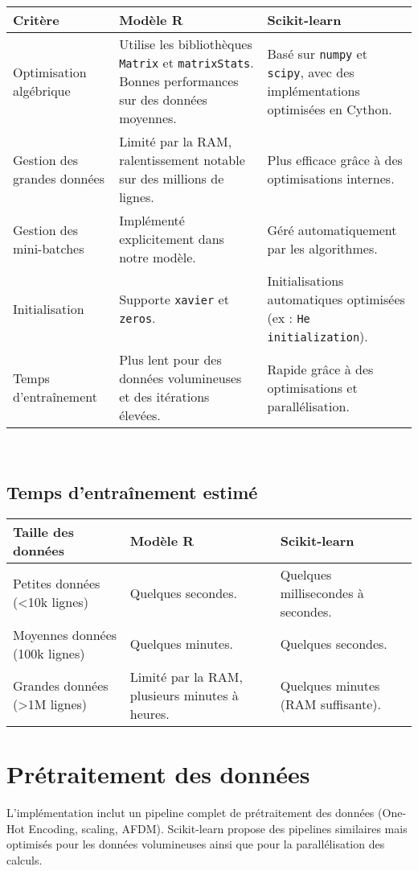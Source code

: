 \documentclass[a4paper,12pt]{article}
\begin{document}
\begin{longtable}{|p{5cm}|p{5cm}|p{5cm}|}
\hline
\textbf{Critère} & \textbf{Modèle R} & \textbf{Scikit-learn} \\
\hline
Optimisation algébrique & Utilise les bibliothèques \texttt{Matrix} et \texttt{matrixStats}. Bonnes performances sur des données moyennes. & Basé sur \texttt{numpy} et \texttt{scipy}, avec des implémentations optimisées en Cython. \\
\hline
Gestion des grandes données & Limité par la RAM, ralentissement notable sur des millions de lignes. & Plus efficace grâce à des optimisations internes. \\

\hline
Gestion des mini-batches & Implémenté explicitement dans notre modèle. & Géré automatiquement par les algorithmes. \\
\hline
Initialisation & Supporte \texttt{xavier} et \texttt{zeros}. & Initialisations automatiques optimisées (ex : \texttt{He initialization}). \\
\hline
Temps d'entraînement & Plus lent pour des données volumineuses et des itérations élevées. & Rapide grâce à des optimisations et parallélisation. \\
\hline
\end{longtable}
\\

\subsection*{Temps d'entraînement estimé}

\begin{longtable}{|p{5cm}|p{5cm}|p{5cm}|}
\hline
\textbf{Taille des données} & \textbf{Modèle R} & \textbf{Scikit-learn} \\
\hline
Petites données (\textless 10k lignes) & Quelques secondes. & Quelques millisecondes à secondes. \\
\hline
Moyennes données (100k lignes) & Quelques minutes. & Quelques secondes. \\
\hline
Grandes données (\textgreater 1M lignes) & Limité par la RAM, plusieurs minutes à heures. & Quelques minutes (RAM suffisante). \\
\hline
\end{longtable}

\section*{Prétraitement des données}
L'implémentation inclut un pipeline complet de prétraitement des données (One-Hot Encoding, scaling, AFDM). Scikit-learn propose des pipelines similaires mais optimisés pour les données volumineuses ainsi que pour la parallélisation des calculs.
\end{document}
